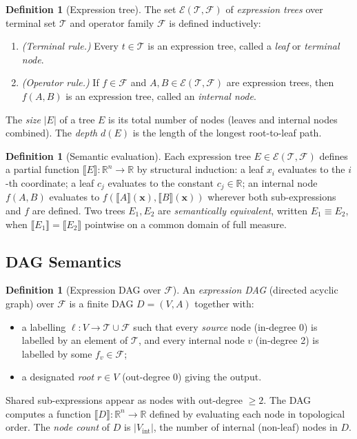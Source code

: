 \documentclass[12pt,a4paper]{article}
\theoremstyle{definition}
\newtheorem{definition}[theorem]{Definition}
\newcommand{\Fam}{\mathcal{F}}
\begin{document}
\begin{definition}[Expression tree]
\label{def:expr-tree}
The set $\mathcal{E}(\mathcal{T}, \Fam)$ of \emph{expression trees} over
terminal set $\mathcal{T}$ and operator family $\Fam$ is defined inductively:
\begin{enumerate}
  \item \emph{(Terminal rule.)}
        Every $t \in \mathcal{T}$ is an expression tree, called a
        \emph{leaf} or \emph{terminal node}.
  \item \emph{(Operator rule.)}
        If $f \in \Fam$ and $A, B \in \mathcal{E}(\mathcal{T},\Fam)$ are
        expression trees, then $f(A, B)$ is an expression tree, called an
        \emph{internal node}.
\end{enumerate}
The \emph{size} $|E|$ of a tree $E$ is its total number of nodes (leaves and
internal nodes combined).  The \emph{depth} $d(E)$ is the length of the longest
root-to-leaf path.
\end{definition}

\begin{definition}[Semantic evaluation]
\label{def:eval}
Each expression tree $E \in \mathcal{E}(\mathcal{T},\Fam)$ defines a partial
function $\llbracket E \rrbracket : \mathbb{R}^n \to \mathbb{R}$ by structural
induction: a leaf $x_i$ evaluates to the $i$-th coordinate; a leaf $c_j$
evaluates to the constant $c_j \in \mathbb{R}$; an internal node $f(A,B)$
evaluates to $f(\llbracket A\rrbracket(\mathbf{x}),
                 \llbracket B\rrbracket(\mathbf{x}))$
wherever both sub-expressions and $f$ are defined.  Two trees $E_1, E_2$ are
\emph{semantically equivalent}, written $E_1 \equiv E_2$, when
$\llbracket E_1 \rrbracket = \llbracket E_2 \rrbracket$ pointwise on
a common domain of full measure.
\end{definition}

\subsection{DAG Semantics}

\begin{definition}[Expression DAG over $\Fam$]
\label{def:dag}
An \emph{expression DAG} (directed acyclic graph) over $\Fam$ is a finite DAG
$D = (V, A)$ together with:
\begin{itemize}
  \item a labelling $\ell : V \to \mathcal{T} \cup \Fam$ such that every
        \emph{source} node (in-degree 0) is labelled by an element of
        $\mathcal{T}$, and every internal node $v$ (in-degree 2) is labelled
        by some $f_v \in \Fam$;
  \item a designated \emph{root} $r \in V$ (out-degree 0) giving the output.
\end{itemize}
Shared sub-expressions appear as nodes with out-degree $\geq 2$.  The DAG
computes a function $\llbracket D \rrbracket : \mathbb{R}^n \to \mathbb{R}$
defined by evaluating each node in topological order.
The \emph{node count} of $D$ is $|V_{\mathrm{int}}|$, the number of internal
(non-leaf) nodes in $D$.
\end{definition}
\end{document}
